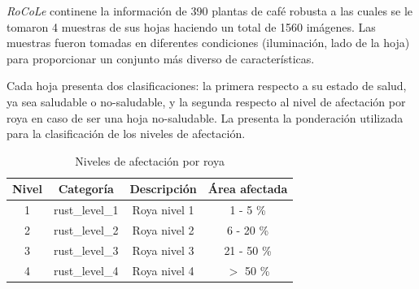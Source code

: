 \textit{RoCoLe} continene la información de 390 plantas de café robusta a las cuales se le tomaron 4 muestras de sus hojas haciendo un total de 1560 imágenes. Las muestras fueron tomadas en diferentes condiciones (iluminación, lado de la hoja) para proporcionar un conjunto más diverso de características.

Cada hoja presenta dos clasificaciones: la primera respecto a su estado de salud, ya sea saludable o no-saludable, y la segunda respecto al nivel de afectación por roya en caso de ser una hoja no-saludable. La  presenta la ponderación utilizada para la clasificación de los niveles de afectación.

\begin{table}[H]
\centering
\begin{tabular}{|c|c|c|c|}
\hline 
\textbf{Nivel} & \textbf{Categoría} & \textbf{Descripción} & \textbf{Área afectada} \\
\hline
1 & rust\_level\_1 & Roya nivel 1 & 1 - 5 \% \\
\hline 
2 & rust\_level\_2 & Roya nivel 2 & 6 - 20 \% \\
\hline 
3 & rust\_level\_3 & Roya nivel 3 & 21 - 50 \% \\
\hline 
4 & rust\_level\_4 & Roya nivel 4 & $>$ 50 \% \\
\hline 
\end{tabular}
\caption{Niveles de afectación por roya}
\label{table:rust_levels}
\end{table}
